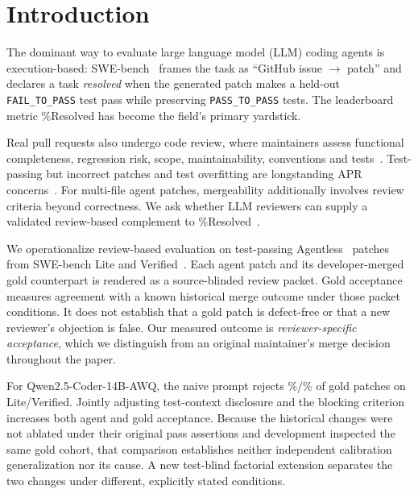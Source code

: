\documentclass[10pt,conference]{IEEEtran}
\begin{document}
\section{Introduction}
The dominant way to evaluate large language model (LLM) coding agents is execution-based:
SWE-bench~\cite{swebench} frames the task as ``GitHub issue $\rightarrow$ patch'' and
declares a task \emph{resolved} when the generated patch makes a held-out
\texttt{FAIL\_TO\_PASS} test pass while preserving \texttt{PASS\_TO\_PASS} tests. The
leaderboard metric \%Resolved has become the field's primary yardstick.

Real pull requests also undergo code review, where maintainers assess functional
completeness, regression risk, scope, maintainability, conventions and tests~\cite{modernreview,tufanoreview}.
Test-passing but incorrect patches and test overfitting are longstanding APR
concerns~\cite{overfitting,qirandom,patchcorrectness,patchsim}. For multi-file agent
patches, mergeability additionally involves review criteria beyond correctness.
We ask whether LLM reviewers can supply a validated review-based complement to
\%Resolved~\cite{llmjudge}.


We operationalize review-based evaluation on test-passing Agentless~\cite{agentless}
patches from SWE-bench Lite and Verified~\cite{swebench,swebenchverified}. Each agent patch
and its developer-merged gold counterpart is rendered as a source-blinded review packet.
Gold acceptance measures agreement with a known historical merge outcome under those
packet conditions. It does not establish that a gold patch is defect-free or that a new
reviewer's objection is false. Our measured outcome is \emph{reviewer-specific acceptance},
which we distinguish from an original maintainer's merge decision throughout the paper.

For Qwen2.5-Coder-14B-AWQ, the naive prompt rejects
\strictFalseRejLite\%/\strictFalseRejVerified\% of gold patches on Lite/Verified.
Jointly adjusting test-context disclosure and the blocking criterion increases both agent
and gold acceptance. Because the historical changes were not ablated under their original pass assertions
and development inspected the same gold cohort, that comparison establishes neither
independent calibration generalization nor its cause. A new test-blind factorial
extension separates the two changes under different, explicitly stated conditions.
\end{document}

